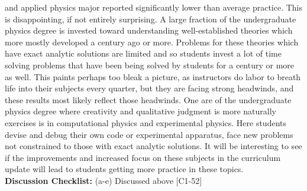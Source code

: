 \documentclass[12pt]{article}
\begin{document}
and applied physics major reported significantly lower than average
practice.  This is disappointing, if not entirely surprising.  A large
fraction of the undergraduate physics degree is invested toward
understanding well-established theories which more mostly developed a
century ago or more.  Problems for these theories which have exact
analytic solutions are limited and so students invest a lot of time
solving problems that have been being solved by students for a century
or more as well.  This paints perhaps too bleak a picture, as
instructors do labor to breath life into their subjects every quarter,
but they are facing strong headwinds, and these results most likely
reflect those headwinds.  One are of the undergraduate physics degree
where creativity and qualitative judgment is more naturally exercises
is in computational physics and experimental physics.  Here students
devise and debug their own code or experimental apparatus, face new
problems not constrained to those with exact analytic solutions.  It
will be interesting to see if the improvements and increased focus on
these subjects in the curriculum update will lead to students getting
more practice in these topics.\\[3pt]

\noindent
{\bf Discussion Checklist:} (a-e) Discussed above [C1-52] 
\end{document}
